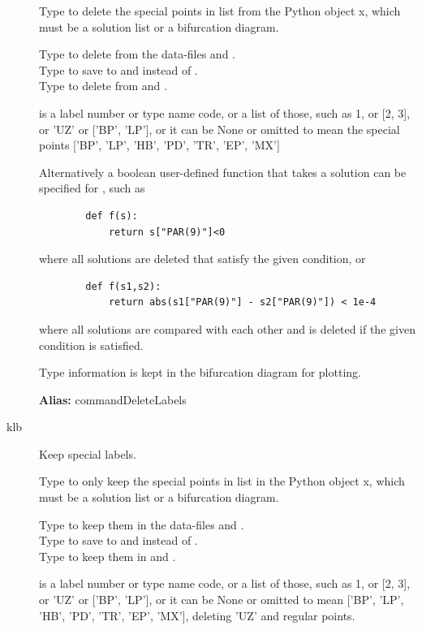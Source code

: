 \documentclass[12pt]{report}
\begin{document}
\begin{description}
    Type  to delete the special points in list from
    the Python object x, which must be a solution list or a bifurcation diagram.

    Type  to delete from the data-files 
     and .\\
    Type  to save to  and
       instead of .\\
    Type  to delete from  and .

     is a label number or type name code, or a list of those,
    such as 1, or [2, 3], or 'UZ' or ['BP', 'LP'], or it can be None or
    omitted to mean the special points ['BP', 'LP', 'HB', 'PD', 'TR',
    'EP', 'MX']

    Alternatively a boolean user-defined function  that
    takes a solution can be specified for , such as
\begin{verbatim}
        def f(s):
            return s["PAR(9)"]<0
\end{verbatim}
    where all solutions are deleted that satisfy the given condition, or
\begin{verbatim}
        def f(s1,s2):
            return abs(s1["PAR(9)"] - s2["PAR(9)"]) < 1e-4
\end{verbatim}
    where all solutions are compared with each other and 
    is deleted if the given condition is satisfied.

    Type information is kept in the bifurcation diagram for plotting.

\textbf{Alias:} commandDeleteLabels

\item[klb]
Keep special labels.

    Type  to only keep the special points in list in
    the Python object x, which must be a solution list or a bifurcation diagram.

    Type  to keep them in the data-files
     and .\\
    Type  to save to  and
       instead of .\\
    Type  to keep them in  and .

     is a label number or type name code, or a list of those,
    such as 1, or [2, 3], or 'UZ' or ['BP', 'LP'], or it can be None or
    omitted to mean ['BP', 'LP', 'HB', 'PD', 'TR', 'EP', 'MX'], deleting 'UZ' and
    regular points.


\end{description}
\end{document}
